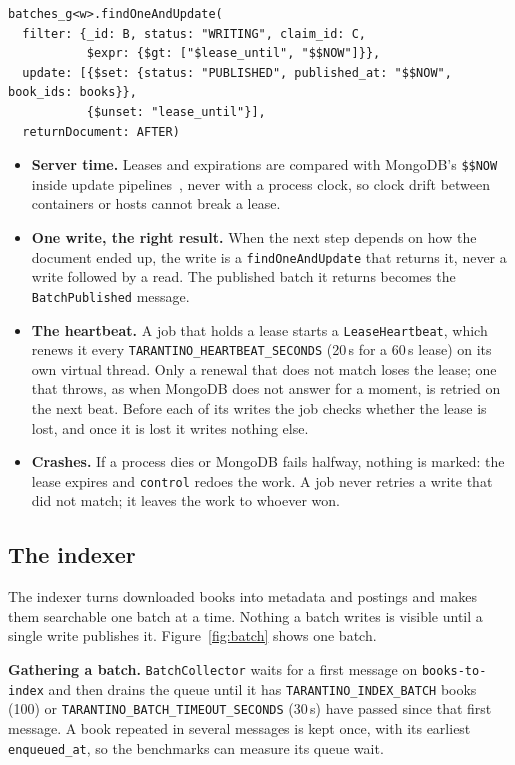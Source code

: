 \documentclass[11pt,a4paper]{article}
\newcommand{\code}[1]{\nolinkurl{#1}}
\begin{document}
\begin{lstlisting}
batches_g<w>.findOneAndUpdate(
  filter: {_id: B, status: "WRITING", claim_id: C,
           $expr: {$gt: ["$lease_until", "$$NOW"]}},
  update: [{$set: {status: "PUBLISHED", published_at: "$$NOW", book_ids: books}},
           {$unset: "lease_until"}],
  returnDocument: AFTER)
\end{lstlisting}

\begin{itemize}
\item \textbf{Server time.} Leases and expirations are compared with MongoDB's \code{$$NOW} inside update pipelines~\cite{mongodb},
  never with a process clock, so clock drift between containers or hosts cannot break a lease.
\item \textbf{One write, the right result.} When the next step depends on how the document ended up, the write is a
  \code{findOneAndUpdate} that returns it, never a write followed by a read. The published batch it returns becomes the
  \code{BatchPublished} message.
\item \textbf{The heartbeat.} A job that holds a lease starts a \code{LeaseHeartbeat}, which renews it every
  \code{TARANTINO_HEARTBEAT_SECONDS} (20\,s for a 60\,s lease) on its own virtual thread. Only a renewal that does not
  match loses the lease; one that throws, as when MongoDB does not answer for a moment, is retried on the next beat.
  Before each of its writes the job checks whether the lease is lost, and once it is lost it writes nothing else.
\item \textbf{Crashes.} If a process dies or MongoDB fails halfway, nothing is marked: the lease expires and
  \code{control} redoes the work. A job never retries a write that did not match; it leaves the work to whoever won.
\end{itemize}

\subsection{The indexer}
\label{sec:indexer}

The indexer turns downloaded books into metadata and postings and makes them searchable one batch at a time. Nothing a
batch writes is visible until a single write publishes it. Figure~\ref{fig:batch} shows one batch.

\textbf{Gathering a batch.} \code{BatchCollector} waits for a first message on \code{books-to-index} and then drains the
queue until it has \code{TARANTINO_INDEX_BATCH} books (100) or \code{TARANTINO_BATCH_TIMEOUT_SECONDS} (30\,s) have
passed since that first message. A book repeated in several messages is kept once, with its earliest
\code{enqueued_at}, so the benchmarks can measure its queue wait.
\end{document}
